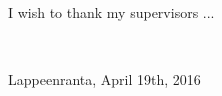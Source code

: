 \begin{preface}
I wish to thank my supervisors ...



\

Lappeenranta, April 19th, 2016
\end{preface}